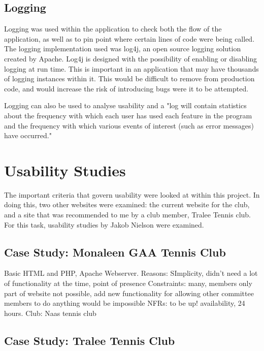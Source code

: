 \subsection{Logging}

Logging was used within the application to check both the flow of the application, as well as to pin point where certain lines of code were being called. The logging implementation used was log4j, an open source logging solution created by Apache. Log4j is designed with the possibility of enabling or disabling logging at run time. This is important in an application that may have thousands of logging instances within it. This would be difficult to remove from production code, and would increase the risk of introducing bugs were it to be attempted. 

Logging can also be used to analyse usability and a "log will contain statistics about the frequency with which each user has used each feature in the program and the frequency with which various events of interest (such as error messages) have occurred." \parencite{holzinger2005usability}

\section{Usability Studies}

The important criteria that govern usability were looked at within this project. In doing this, two other websites were examined: the current website for the club, and a site that was recommended to me by a club member, Tralee Tennis club. For this task, usability studies by Jakob Nielson were examined. 

\subsection{Case Study: Monaleen GAA Tennis Club}

Basic HTML and PHP, Apache Webserver.
Reasons: SImplicity, didn't need a lot of functionality at the time, point of presence
Constraints: many, members only part of website not possible, add new functionality for allowing other committee members to do anything would be impossible
NFRs: to be up! availability, 24 hours.
Club: Naas tennis club

\subsection{Case Study: Tralee Tennis Club}